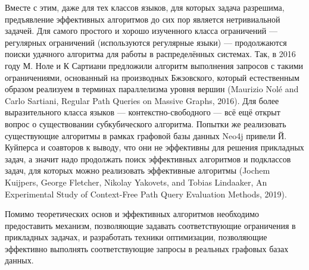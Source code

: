 \documentclass[12pt]{article}  %
\theoremstyle{remark}
\begin{document}
Вместе с этим, даже для тех классов языков, для которых задача разрешима, предъявление эффективных алгоритмов до сих пор является нетривиальной задачей. Для самого простого и хорошо изученного класса ограничений — регулярных ограничений (используются регулярные языки) — продолжаются поиски удачного алгоритма для работы в распределённых системах. Так, в 2016 году М. Ноле и К Сартиани предложили алгоритм выполнения запросов с такими ограничениями, основанный на производных Бжзовского, который естественным образом реализуем в терминах параллелизма уровня вершин (Maurizio Nolé and Carlo Sartiani, Regular Path Queries on Massive Graphs, 2016). Для более выразительного класса языков — контекстно-свободного — всё ещё открыт вопрос о существовании субкубического алгоритма. Попытки же реализовать существующие алгоритмы в рамках графовой базы данных  Neo4j привели Й. Куйперса и соавторов к выводу, что они не эффективны для решения прикладных задач, а значит надо продолжать поиск эффективных алгоритмов и подклассов задач, для которых можно реализовать эффективные алгоритмы (Jochem Kuijpers, George Fletcher, Nikolay Yakovets, and Tobias Lindaaker, An Experimental Study of Context-Free Path Query Evaluation Methods,  2019).

Помимо теоретических основ и эффективных алгоритмов необходимо предоставить механизм, позволяющие задавать соответствующие ограничения в прикладных задачах, и разработать техники оптимизации, позволяющие эффективно выполнять соответствующие запросы в реальных графовых базах данных.
\end{document}
